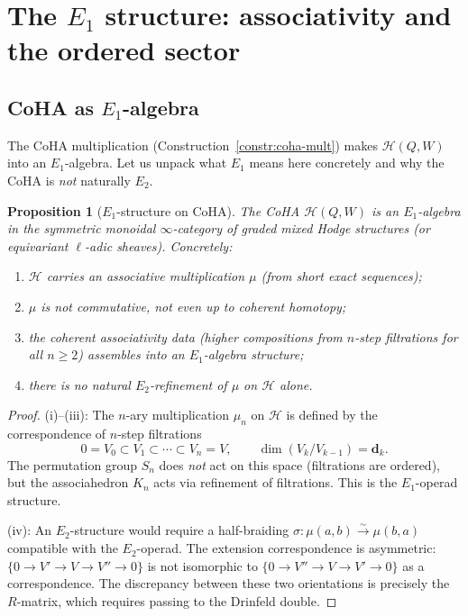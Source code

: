 \documentclass[11pt]{article}
\newtheorem{proposition}[theorem]{Proposition}
\theoremstyle{definition}
\theoremstyle{remark}
\newcommand{\CoHA}{\mathcal{H}}
\begin{document}
\section{The $E_1$ structure: associativity and the ordered sector}
\label{sec:e1-structure}

\subsection{CoHA as $E_1$-algebra}
\label{subsec:coha-e1}

The CoHA multiplication (Construction~\ref{constr:coha-mult}) makes $\CoHA(Q,W)$
into an $E_1$-algebra. Let us unpack what $E_1$ means here concretely and
why the CoHA is \emph{not} naturally $E_2$.

\begin{proposition}[$E_1$-structure on CoHA]
\label{prop:coha-e1}
The CoHA $\CoHA(Q,W)$ is an $E_1$-algebra in the symmetric monoidal
$\infty$-category of graded mixed Hodge structures (or equivariant
$\ell$-adic sheaves). Concretely:
\begin{enumerate}[label=(\roman*)]
 \item $\CoHA$ carries an associative multiplication $\mu$ (from
 short exact sequences);
 \item $\mu$ is \emph{not} commutative, not even up to coherent homotopy;
 \item the coherent associativity data (higher compositions from
 $n$-step filtrations for all $n \geq 2$) assembles into an
 $E_1$-algebra structure;
 \item there is no natural $E_2$-refinement of $\mu$ on $\CoHA$ alone.
\end{enumerate}
\end{proposition}

\begin{proof}
(i)--(iii): The $n$-ary multiplication $\mu_n$ on $\CoHA$ is defined by the
correspondence of $n$-step filtrations
\[
 0 = V_0 \subset V_1 \subset \cdots \subset V_n = V, \qquad
 \dim(V_k/V_{k-1}) = \mathbf{d}_k.
\]
The permutation group $S_n$ does \emph{not} act on this space (filtrations are
ordered), but the associahedron $K_n$ acts via refinement of filtrations.
This is the $E_1$-operad structure.

(iv): An $E_2$-structure would require a half-braiding $\sigma \colon \mu(a,b)
\xrightarrow{\sim} \mu(b,a)$ compatible with the $E_2$-operad. The extension
correspondence is asymmetric: $\{0 \to V' \to V \to V'' \to 0\}$ is not
isomorphic to $\{0 \to V'' \to V \to V' \to 0\}$ as a correspondence. The
discrepancy between these two orientations is precisely the $R$-matrix, which
requires passing to the Drinfeld double.
\end{proof}
\end{document}
